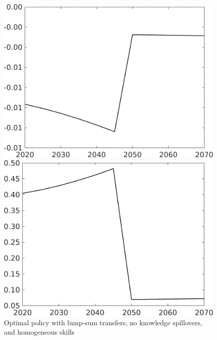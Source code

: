 \clearpage
\begin{figure}[h!!!]
	\centering
	\caption{Optimal policy with lump-sum transfers, no knowledge spillovers, and homogeneous skills }\label{fig:opt_TLs_noknow_homoskill}
	\begin{minipage}[]{0.32\textwidth}
		\includegraphics[width=1\textwidth]{../../codding_model/own_basedOnFried/optimalPol_010922_revision/figures/all_13Sept22_Tplus30/taul_OPT_COMPtaul_regime4_spillover0_knspil1_noskill1_sep0_xgrowth0_PV1_etaa0.79_lgd0.png}
	\end{minipage}
	\begin{minipage}[]{0.32\textwidth}
		\includegraphics[width=1\textwidth]{../../codding_model/own_basedOnFried/optimalPol_010922_revision/figures/all_13Sept22_Tplus30/tauf_OPT_COMPtaulPer_regime4_spillover0_knspil1_noskill1_sep0_xgrowth0_PV1_etaa0.79.png}

\end{minipage}
\end{figure}
